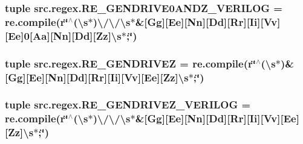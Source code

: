 \hypertarget{namespacesrc_1_1regex_aaabe4775992c97fe63c6fc23d9c0258a}{
\subsubsection[{R\-E\-\_\-\-G\-E\-N\-D\-R\-I\-V\-E0\-A\-N\-D\-Z\-\_\-\-V\-E\-R\-I\-L\-O\-G}]{\setlength{\rightskip}{0pt plus 5cm}tuple src.\-regex.\-R\-E\-\_\-\-G\-E\-N\-D\-R\-I\-V\-E0\-A\-N\-D\-Z\-\_\-\-V\-E\-R\-I\-L\-O\-G = re.\-compile(r\char`\"{}$^\wedge$(\textbackslash{}s$\ast$)\textbackslash{}/\textbackslash{}/\textbackslash{}s$\ast$\&\mbox{[}Gg\mbox{]}\mbox{[}Ee\mbox{]}\mbox{[}Nn\mbox{]}\mbox{[}Dd\mbox{]}\mbox{[}Rr\mbox{]}\mbox{[}Ii\mbox{]}\mbox{[}Vv\mbox{]}\mbox{[}Ee\mbox{]}0\mbox{[}Aa\mbox{]}\mbox{[}Nn\mbox{]}\mbox{[}Dd\mbox{]}\mbox{[}Zz\mbox{]}\textbackslash{}s$\ast$;\char`\"{})}}\label{namespacesrc_1_1regex_aaabe4775992c97fe63c6fc23d9c0258a}
\hypertarget{namespacesrc_1_1regex_af1c74060e9f9c72a872b6dc2c5f62d31}{
\subsubsection[{R\-E\-\_\-\-G\-E\-N\-D\-R\-I\-V\-E\-Z}]{\setlength{\rightskip}{0pt plus 5cm}tuple src.\-regex.\-R\-E\-\_\-\-G\-E\-N\-D\-R\-I\-V\-E\-Z = re.\-compile(r\char`\"{}$^\wedge$(\textbackslash{}s$\ast$)\&\mbox{[}Gg\mbox{]}\mbox{[}Ee\mbox{]}\mbox{[}Nn\mbox{]}\mbox{[}Dd\mbox{]}\mbox{[}Rr\mbox{]}\mbox{[}Ii\mbox{]}\mbox{[}Vv\mbox{]}\mbox{[}Ee\mbox{]}\mbox{[}Zz\mbox{]}\textbackslash{}s$\ast$;\char`\"{})}}\label{namespacesrc_1_1regex_af1c74060e9f9c72a872b6dc2c5f62d31}
\hypertarget{namespacesrc_1_1regex_aa6914fb0c9195e0410ae28c6d710f0c0}{
\subsubsection[{R\-E\-\_\-\-G\-E\-N\-D\-R\-I\-V\-E\-Z\-\_\-\-V\-E\-R\-I\-L\-O\-G}]{\setlength{\rightskip}{0pt plus 5cm}tuple src.\-regex.\-R\-E\-\_\-\-G\-E\-N\-D\-R\-I\-V\-E\-Z\-\_\-\-V\-E\-R\-I\-L\-O\-G = re.\-compile(r\char`\"{}$^\wedge$(\textbackslash{}s$\ast$)\textbackslash{}/\textbackslash{}/\textbackslash{}s$\ast$\&\mbox{[}Gg\mbox{]}\mbox{[}Ee\mbox{]}\mbox{[}Nn\mbox{]}\mbox{[}Dd\mbox{]}\mbox{[}Rr\mbox{]}\mbox{[}Ii\mbox{]}\mbox{[}Vv\mbox{]}\mbox{[}Ee\mbox{]}\mbox{[}Zz\mbox{]}\textbackslash{}s$\ast$;\char`\"{})}}\label{namespacesrc_1_1regex_aa6914fb0c9195e0410ae28c6d710f0c0}
